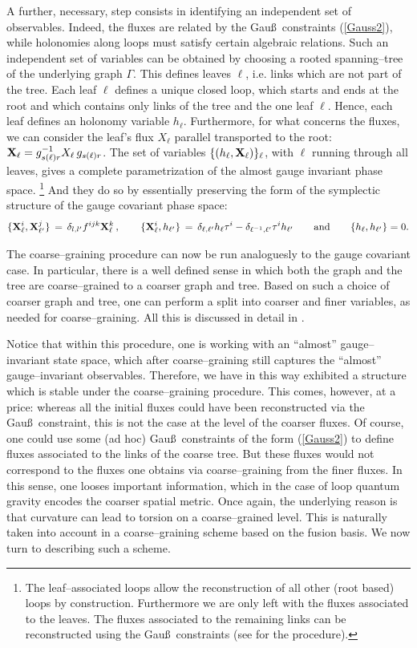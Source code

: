 \documentclass[nofootinbib,superscriptaddress,eqsecnum,tightenlines,11pt]{revtex4-1}
\def\q{\qquad}
\def\ba{\begin{eqnarray}}
\def\ea{\end{eqnarray}}
\begin{document}
A further, necessary, step consists in identifying an independent set of observables.
Indeed, the fluxes are related by the Gau\ss~constraints (\ref{Gauss2}), while holonomies along loops must satisfy certain algebraic relations.
Such an independent set of variables can be obtained by choosing a rooted spanning--tree of the underlying graph $\Gamma$. 
This defines leaves $\ell$, i.e. links which are not part of the tree.
Each leaf $\ell$ defines a unique closed loop, which starts and ends at the root and which contains only links of the tree and the one leaf $\ell$. 
Hence, each leaf defines an holonomy variable $h_\ell$. 
Furthermore, for what concerns the fluxes, we can consider the leaf's flux  $X_\ell$ parallel transported to the root: ${\bf X}_\ell =   g^{-1}_{s(\ell)  r}     X_\ell  \, g_{s(\ell)  r}$.
The set of variables $\{(h_\ell, {\bf X}_\ell)\}_\ell$, with $\ell$ running through all leaves, gives a complete parametrization of the almost gauge invariant phase space.%
\footnote{The leaf--associated loops allow the reconstruction of all other (root based) loops by construction. Furthermore we are only left with the fluxes associated to the leaves. The fluxes associated to the remaining links can be reconstructed using the Gau\ss~constraints (see \cite{DG14b} for the procedure). }
And they do so by essentially preserving the form of the symplectic structure of the gauge covariant phase space:
\ba
\{{\bf X}^i_\ell, {\bf X}^j_{\ell'}\}\,=\,\delta_{l,l'}f^{ijk}{\bf X}^k_\ell \, , \q \{{\bf X}^i_\ell,h_{\ell'}\} \,=\, \delta_{\ell,\ell'} h_{\ell} \tau^i - \delta_{\ell^{-1},\ell'} \tau^i h_{\ell'} \q\text{and}\q \{h_\ell,h_{\ell'}\}=0 .
\ea

The coarse--graining procedure can now be run analoguesly to the gauge covariant case.
In  particular, there is a well defined sense in which both the graph and the tree are coarse--grained to a coarser graph and tree. 
Based on such a choice of coarser graph and tree, one can perform a split into coarser and finer variables, as needed for coarse--graining.
All this is discussed in detail in \cite{BDG15}. 

Notice that within this procedure, one is working with an ``almost'' gauge--invariant state space, which after coarse--graining still captures the ``almost'' gauge--invariant observables. 
Therefore, we have in this way exhibited a structure which is stable under the coarse--graining procedure. 
This comes, however, at a price: whereas all the initial fluxes could have been reconstructed via the Gau\ss~constraint, this is not the case at the level of the coarser fluxes. 
Of course, one could use some (ad hoc) Gau\ss~constraints of the form (\ref{Gauss2}) to define fluxes associated to the links of the coarse tree.
But these fluxes would not correspond to the fluxes one obtains via coarse--graining from the finer fluxes. %
 In this sense, one looses {important} information, which in the case of loop quantum gravity encodes the coarser spatial metric.
Once again, the underlying reason is that curvature can lead to torsion on a coarse--grained level.  
This is naturally taken into account in a coarse--graining scheme based on the fusion basis.
We now turn to describing such a scheme.
\end{document}

